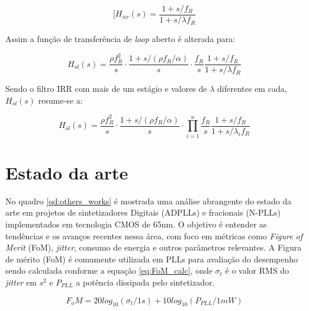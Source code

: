 	\begin{equation}
	[H_{iir}(s) = \frac{ 1 + s/f_R}{ 1 + s/\lambda f_R}
	\label{eq:irr_s_domain}
	\end{equation}
	
Assim a função de transferência de \textit{loop} aberto é alterada para:


\begin{equation}
	H_{ol}(s) = \frac{\rho f_R^2}{s} \cdot \frac{1 + s/(\rho f_R / \alpha)}{s} \cdot \frac{f_R}{s} \frac{ 1 + s/f_R}{ 1 + s/\lambda f_R}
	\label{eq:hol_irr_simgle}
\end{equation}


Sendo o filtro IRR com mais de um estágio e valores de $\lambda$ diferentes em cada,  $H_{ol}(s)$ resume-se a:

\begin{equation}
H_{ol}(s) = \frac{\rho f_R^2}{s} \cdot \frac{1 + s/(\rho f_R / \alpha)}{s} \cdot \prod_{i=1}^{n} \frac{f_R}{s} \frac{ 1 + s/f_R}{ 1 + s/\lambda_i f_R}
	\label{eq:hol_irr_cascade}
\end{equation}


\section{Estado da arte}

No quadro \ref{qd:others_works} é mostrada uma análise abrangente do estado da arte em projetos de sintetizadores Digitais (ADPLLs) e fracionais (N-PLLs) implementados em tecnologia CMOS de 65nm. O objetivo é entender as tendências e os avanços recentes nessa área, com foco em métricas como \textit{Figure of Merit} (FoM), \textit{jitter}, consumo de energia e outros parâmetros relevantes. A Figura de mérito (FoM) é comumente utilizada em PLLs para avaliação do desempenho sendo calculada conforme a equação \ref{eq:FoM_calc}, onde $\sigma_t$  é o valor RMS do \textit{jitter} em $s^2$ e $P_{PLL}$ a potência dissipada pelo sintetizador.

\begin{equation}
	F_oM = 20log_{10}(\sigma_t/1s) + 10log_{10}(P_{PLL}/1mW)
	\label{eq:FoM_calc}
\end{equation}


